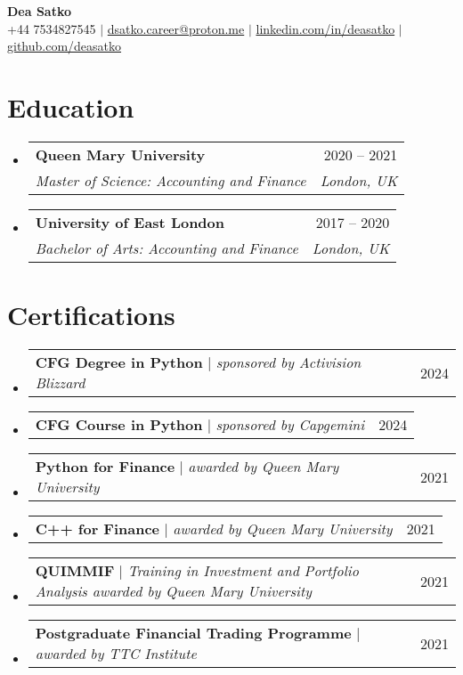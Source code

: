 \documentclass[letterpaper,11pt]{article}
\makeatletter
\newcommand{\resumeSubheading}[4]{
  \vspace{-2pt}\item
    \begin{tabular*}{0.97\textwidth}[t]{l@{\extracolsep{\fill}}r}
      \textbf{#1} & #2 \\
      \textit{\small#3} & \textit{\small #4} \\
    \end{tabular*}\vspace{-7pt}
}
\newcommand{\resumeProjectHeading}[2]{
    \item
    \begin{tabular*}{0.97\textwidth}{l@{\extracolsep{\fill}}r}
      \small#1 & #2 \\
    \end{tabular*}\vspace{-7pt}
}
\newcommand{\resumeSubHeadingListStart}{\begin{itemize}[leftmargin=0.15in, label={}]}
\newcommand{\resumeSubHeadingListEnd}{\end{itemize}}
\makeatother
\begin{document}
\begin{center}
    \textbf{\Huge Dea Satko} \\ \vspace{1pt}
    \small +44 7534827545 $|$ \href{mailto:dsatko.career@proton.me}{{dsatko.career@proton.me}} $|$ 
    \href{https://www.linkedin.com/in/deasatko/}{{linkedin.com/in/deasatko}} $|$
    \href{https://github.com/deasatko/}{{github.com/deasatko}}
\end{center}


\section{Education}
  \resumeSubHeadingListStart
    \resumeSubheading
      {Queen Mary University}{2020 -- 2021}
      {Master of Science: Accounting and Finance}{London, UK}
    \resumeSubheading
      {University of East London}{2017 -- 2020}
      {Bachelor of Arts: Accounting and Finance}{London, UK}
  \resumeSubHeadingListEnd

\section{Certifications}
  \resumeSubHeadingListStart
    \resumeProjectHeading
      {\textbf{CFG Degree in Python} $|$ \emph{sponsored by Activision Blizzard}}{2024}
    \resumeProjectHeading
      {\textbf{CFG Course in Python} $|$ \emph{sponsored by Capgemini}}{2024}
    \resumeProjectHeading
      {\textbf{Python for Finance} $|$ \emph{awarded by Queen Mary University}}{2021}
      \resumeProjectHeading
      {\textbf{C++ for Finance} $|$ \emph{awarded by Queen Mary University}}{2021}
    \resumeProjectHeading
      {\textbf{QUIMMIF} $|$ \emph{Training in Investment and Portfolio Analysis awarded by Queen Mary University}}{2021}
    \resumeProjectHeading
      {\textbf{Postgraduate Financial Trading Programme} $|$ \emph{awarded by TTC Institute}}{2021}
\resumeSubHeadingListEnd

\end{document}
